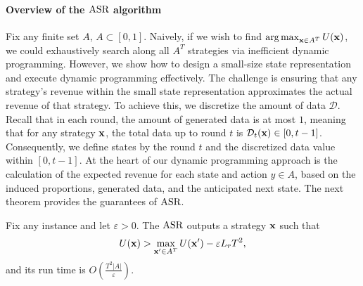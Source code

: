 \paragraph{Overview of the $\textnormal{ASR}$ algorithm}
Fix any finite set $A$, $A \subset [0, 1]$. Naively, if we wish to find  $ \operatorname*{arg\,max}_{{\bf{x}} \in A^T}U({\bf{x}})$, we could exhaustively search along all $A^T$ strategies via inefficient dynamic programming. However, we show how to design a small-size state representation and execute dynamic programming effectively. The challenge is ensuring that any strategy's revenue within the small state representation approximates the actual revenue of that strategy. To achieve this, we discretize the amount of data $\mathcal D$. Recall that in each round, the amount of generated data is at most $1$, meaning that for any strategy ${\bf{x}}$, the total data up to round $t$ is $\mathcal{D}_t({\bf{x}}) \in [0, t - 1]$. Consequently, we define states by the round $t$ and the discretized data value within $[0, t-1]$. At the heart of our dynamic programming approach is the calculation of the expected revenue for each state and action $y \in A$, based on the induced proportions, generated data, and the anticipated next state. The next theorem provides the guarantees of $\textnormal{ASR}$. 
\begin{theorem} \label{thm: alg guarantees fixed actions}
Fix any instance and let $\varepsilon > 0$. The $\textnormal{ASR}$ outputs a strategy ${\bf{x}}$ such that
\begin{equation}\label{eq:thm unconst}
U({\bf{x}}) > \max_{{\bf{x'}} \in A^T}U({\bf{x}}') - \varepsilon L_r T^2,    
\end{equation}
and its run time is $O\left(\frac{T^2 \left| A \right|}{\varepsilon}\right)$.
\end{theorem}

